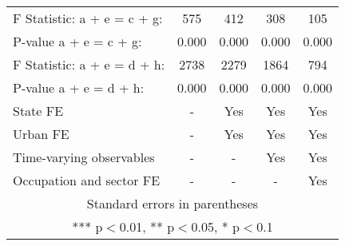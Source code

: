 \begin{tabular}{lcccc}
F Statistic: a + e = c  + g: & 575 & 412 & 308 & 105 \\
\hspace{1mm} P-value a + e = c + g: & 0.000 & 0.000 & 0.000 & 0.000 \\
F Statistic: a + e = d + h: & 2738 & 2279 & 1864 & 794 \\
\hspace{1mm} P-value a + e = d + h: & 0.000 & 0.000 & 0.000 & 0.000 \\
State FE & - & Yes & Yes & Yes \\
Urban FE & - & Yes & Yes & Yes \\
Time-varying observables & - & - & Yes & Yes \\
 Occupation and sector FE & - & - & - & Yes \\ \hline
\multicolumn{5}{c}{ Standard errors in parentheses} \\
\multicolumn{5}{c}{ *** p$<$0.01, ** p$<$0.05, * p$<$0.1} \\
\end{tabular}
